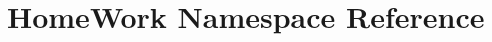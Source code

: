 \hypertarget{namespace_home_work}{}\section{Home\+Work Namespace Reference}
\label{namespace_home_work}
